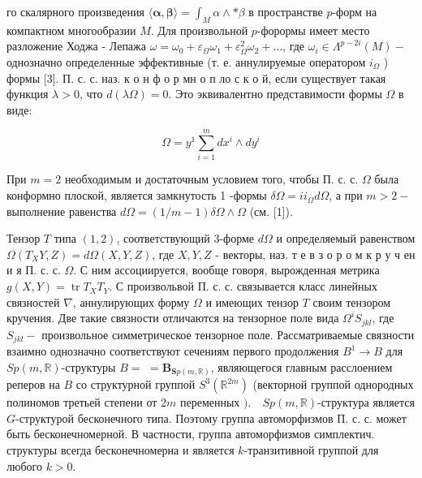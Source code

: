 \documentclass[10pt]{article}
\begin{document}
го скалярного произведения $\langle\boldsymbol{\alpha}, \boldsymbol{\beta}\rangle=\int_{M} \alpha \wedge * \beta$ в пространстве $p$-форм на компактном многообразии $M$. Для произвольной $p$-форормы имеет место разложение Ходжа - Лепажа $\omega=\omega_{0}+\varepsilon_{\Omega} \omega_{1}+\varepsilon_{\Omega}^{2} \omega_{2}+\ldots$, где $\omega_{i} \in \Lambda^{p-2 i}(M)-$ однозначно определенные эффективные (т. е. аннулируемые оператором $i_{\Omega}$ ) формы [3]. П. с. с. наз. к о н ф о р мн о п ло с к о й, если существует такая функция $\lambda>0$, что $d(\lambda \Omega)=0$. Это эквивалентно представимости формы $\Omega$ в виде:



\[

\Omega=y^{1} \sum_{i=1}^{m} d x^{i} \wedge d y^{i}

\]



При $m=2$ необходимым и достаточным условием того, чтобы П. с. с. $\Omega$ была конформно плоской, является замкнутость 1 -формы $\delta \Omega=i i_{\Omega} d \Omega$, а при $m>2-$ выполнение равенства $d \Omega=(1 / m-1) \delta \Omega \wedge \Omega$ (см. [1]).



Тензор $T$ типа $(1,2)$, соответствующий 3-форме $d \Omega$ и определяемый равенством $\Omega\left(T_{X} Y, Z\right)=d \Omega(X, Y, Z)$, где $X, Y, Z$ - векторы, наз. т е в з о р о м к р у ч ен и я П. с. с. $\Omega$. С ним ассоциируется, вообще говоря, вырожденная метрика $g(X, Y)=\operatorname{tr} T_{X} T_{Y}$. С произвольвой П. с. с. связывается класс линейных связностей $\nabla$, аннулирующих форму $\Omega$ и имеющих тензор $T$ своим тензором кручения. Две такие связности отличаются на тензорное поле вида $\Omega^{i} S_{j k l}$, где $S_{j k l}-$ произвольное симметрическое тензорное поле. Рассматриваемые связности взаимно однозначно соответствуют сечениям первого продолжения $B^{1} \rightarrow B$ для $S p(m, \mathbb{R})$-структуры $B=$ $=\boldsymbol{B}_{\boldsymbol{S} p(m, \mathbb{R})}$, являющегося главным расслоением реперов на $B$ со структурной группой $S^{3}\left(\mathbb{R}^{2 m}\right)$ (векторной группой однородных полиномов третьей степени от $2 m$ переменных $). \quad S p(m, \mathbb{R})$-структура является $G$-структурой бесконечного типа. Поэтому группа автоморфизмов П. с. с. может быть бесконечномерной. В частности, группа автоморфизмов симплектич. структуры всегда бесконечномерна и является $k$-транзитивной группой для любого $k>0$.
\end{document}
